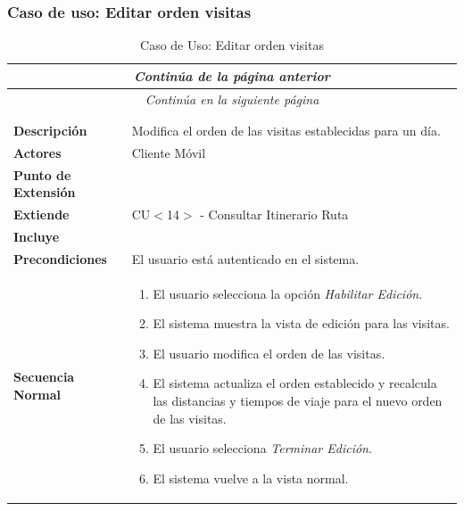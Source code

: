 \newpage
\subsubsection*{Caso de uso: Editar orden visitas }
\begin{longtable}{| p{4cm} | p{10cm} |}
\endfirsthead
\multicolumn{2}{c}{\textit{Continúa de la página anterior}}\\[12pt]
\hline
\endhead
\hline
\multicolumn{2}{c}{\textit{Continúa en la siguiente página}} \\
\endfoot
\hline
\caption{Caso de Uso: Editar orden visitas}\label{fig:1}\\
\endlastfoot


\hline
\multicolumn{2}{|c|}{\textbf{CU$<$15$>$ - Editar Orden Visitas}} \\

\hline
\textbf{Descripción} &
Modifica el orden de las visitas establecidas para un día.\\

\hline
\textbf{Actores} &
Cliente Móvil\\

\hline
\textbf{Punto de Extensión} &
\\

\hline
\textbf{Extiende} &
CU$<$14$>$ - Consultar Itinerario Ruta
\\

\hline
\textbf{Incluye} &
\\

\hline
\textbf{Precondiciones} &
El usuario está autenticado en el sistema.\\

\hline
\textbf{Secuencia Normal} &\mbox{}\par\vspace{-\baselineskip}
\begin{enumerate}[leftmargin=0.7cm, topsep=0.1cm]
\item El usuario selecciona la opción \textit{Habilitar Edición}.
\item El sistema muestra la vista de edición para las visitas.
\item El usuario modifica el orden de las visitas.
\item El sistema actualiza el orden establecido y recalcula las distancias y tiempos de viaje para el nuevo orden de las visitas.
\item El usuario selecciona \textit{Terminar Edición}.
\item El sistema vuelve a la vista normal.
\end{enumerate}



\end{longtable}
